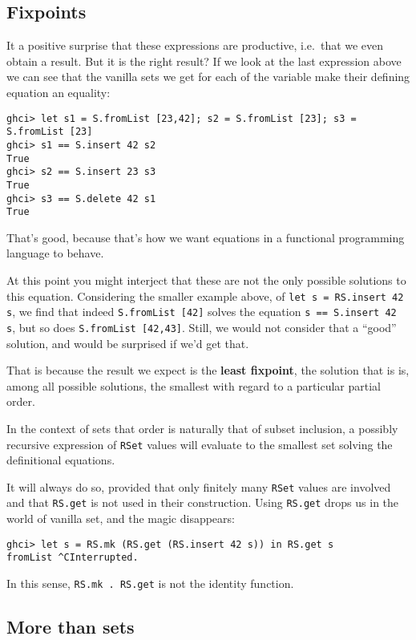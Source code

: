 \documentclass[manuscript,screen,acmsmall]{acmart}
\begin{document}
\subsection{Fixpoints}

It a positive surprise that these expressions are productive, i.e.\ that we even obtain a result. But it is the right result? If we look at the last expression above we can see that the vanilla sets we get for each of the variable make their defining equation an equality:
\begin{verbatim}
ghci> let s1 = S.fromList [23,42]; s2 = S.fromList [23]; s3 = S.fromList [23]
ghci> s1 == S.insert 42 s2
True
ghci> s2 == S.insert 23 s3
True
ghci> s3 == S.delete 42 s1
True
\end{verbatim}

That’s good, because that’s how we want equations in a functional programming language to behave.

At this point you might interject that these are not the only possible solutions to this equation. Considering the smaller example above, of \verb|let s = RS.insert 42 s|, we find that indeed \verb|S.fromList [42]| solves the equation \verb|s == S.insert 42 s|, but so does \verb|S.fromList [42,43]|. Still, we would not consider that a “good” solution, and would be surprised if we'd get that.

That is because the result we expect is the \textbf{least fixpoint}, the solution that is is, among all possible solutions, the smallest with regard to a particular partial order.

In the context of sets that order is naturally that of subset inclusion, a possibly recursive expression of \verb|RSet| values will evaluate to the smallest set solving the definitional equations.

It will always do so, provided that only finitely many \verb|RSet| values are involved and that \verb|RS.get| is not used in their construction. Using \verb|RS.get| drops us in the world of vanilla set, and the magic disappears:
\begin{verbatim}
ghci> let s = RS.mk (RS.get (RS.insert 42 s)) in RS.get s
fromList ^CInterrupted.
\end{verbatim}
In this sense, \verb|RS.mk . RS.get| is not the identity function.

\subsection{More than sets}
\end{document}
